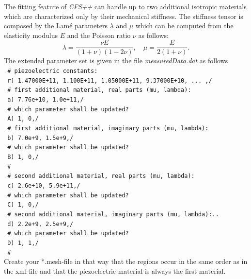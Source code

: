 The fitting feature of {\it CFS++} can handle up to two additional isotropic materials which are characterized only by their mechanical stiffness. The stiffness tensor is composed by the Lam\'{e} parameters $\lambda$ and $\mu$ which can be computed from the elasticity modulus $E$ and the Poisson ratio $\nu$ as follows:
$$\lambda = \frac{\nu E}{(1+\nu)(1-2\nu)},\quad \mu = \frac{E}{2(1+\nu)}.$$
 The extended parameter set is given in the file {\it measuredData.dat} as follows\\
\verb! # piezoelectric constants:! \\
\verb! r) 1.47000E+11, 1.100E+11, 1.05000E+11, 9.37000E+10, ... ,/ !\\
\verb! # first additional material, real parts (mu, lambda):!\\
\verb! a) 7.76e+10, 1.0e+11,/!\\
\verb! # which parameter shall be updated?!\\
\verb! A) 1, 0,/ !\\
\verb! # first additional material, imaginary parts (mu, lambda):!\\
\verb! b) 7.0e+9, 1.5e+9,/!\\
\verb! # which parameter shall be updated?!\\
\verb! B) 1, 0,/ !\\
\verb! #!\\
\verb! # second additional material, real parts (mu, lambda):!\\
\verb! c) 2.6e+10, 5.9e+11,/!\\
\verb! # which parameter shall be updated?!\\
\verb! C) 1, 0,/ !\\
\verb! # second additional material, imaginary parts (mu, lambda):..!\\
\verb! d) 2.2e+9, 2.5e+9,/!\\
\verb! # which parameter shall be updated?! \\
\verb! D) 1, 1,/ !\\
\verb! #!\\

\noindent Create your *.mesh-file in that way that the regions occur in the same order as in the xml-file and that the piezoelectric material is always the first material.



